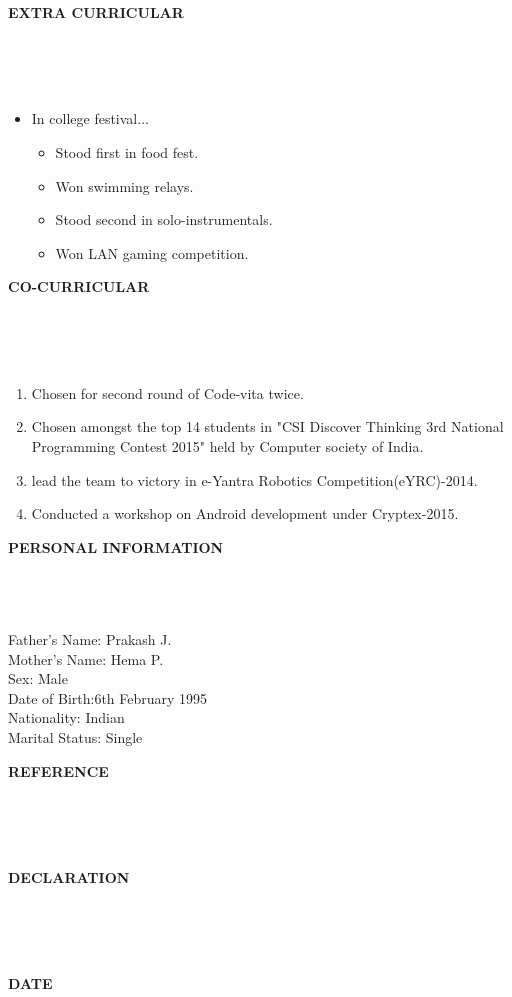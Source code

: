 \documentclass[a4paper,10pt]{article}
\newcommand{\lsep}{-0.5cm}
\newcommand{\resheading}[1]{{\small \colorbox{mygrey}{\begin{minipage}{0.975\textwidth}{\textbf{#1 \vphantom{p\^{E}}}}\end{minipage}}}}
\begin{document}
\resheading{\textbf{EXTRA CURRICULAR} }\\[\lsep]
\\ \\


\begin{itemize}
		\item \noindent In college festival...
		\begin{itemize}
			\item Stood first in food fest.
			\item Won swimming relays.
			\item Stood second in solo-instrumentals.
			\item Won LAN gaming competition.
		\end{itemize}
\end{itemize}

\resheading{\textbf{CO-CURRICULAR} }\\[\lsep]
\\ \\
\begin{enumerate}
			\item \noindent Chosen for second round of Code-vita twice.
			\item \noindent Chosen amongst the top 14 students in "CSI Discover Thinking 3rd National Programming Contest 2015" held by Computer society of India.
			\item \noindent lead the team to victory in e-Yantra Robotics Competition(eYRC)-2014.
			\item \noindent Conducted a workshop on Android development under Cryptex-2015.
\end{enumerate}

\resheading{\textbf{PERSONAL INFORMATION} }\\[\lsep]
\\ \\
\indent Father’s Name: Prakash J. \\
\indent Mother’s Name: Hema P. \\
\indent Sex: Male \\
\indent Date of Birth:6th February 1995 \\
\indent Nationality: Indian \\
\indent Marital Status: Single \\

\resheading{\textbf{REFERENCE} }\\[\lsep]
\\ \\

\resheading{\textbf{DECLARATION} }\\[\lsep]
\\ \\


\resheading{\textbf{DATE} }\\[\lsep]
\\ \\
\end{document}
